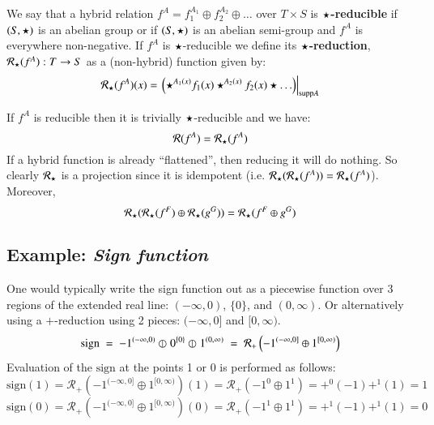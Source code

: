 \begin{definition}
	We say that a hybrid relation $f^A = f_1^{A_1} \oplus f_2^{A_2} \oplus \ldots$ over $T \times S$ 
	is $\star$\textbf{-reducible} if $(S, \star)$ is an abelian group 
	or if $(S, \star)$ is an abelian semi-group and $f^A$ is everywhere non-negative.
	If $f^A$ is $\star$-reducible we define its $\star$\textbf{-reduction}, $\mathcal{R}_\star(f^A) :  T \to S$ 
	as a (non-hybrid) function given by:
	\begin{equation}
		\mathcal{R}_\star (f^A)(x) = \left.\left(\star^{A_1(x)} f_1(x) \star^{A_2(x)} f_2(x) \star \ldots \right)\right|_{\text{supp} A}
	\end{equation}
\end{definition}


If $f^A$ is reducible then it is trivially $\star$-reducible and we have:
\begin{equation}
	\mathcal{R}(f^A) = \mathcal{R}_\star(f^A)
\end{equation}
If a hybrid function is already ``flattened'', then reducing it will do nothing.
So clearly $\mathcal{R}_\star$ is a projection since it is idempotent  (i.e. $\mathcal{R}_\star ( \mathcal{R}_\star( f^A)) = \mathcal{R}_\star(f^A)$).
Moreover,
\begin{equation}
	\mathcal{R}_\star( \mathcal{R}_\star(f^F) \oplus \mathcal{R}_\star(g^G)) =\mathcal{R}_\star( f^F \oplus g^G)
\end{equation}


\subsection{Example: \emph{Sign function}}

One would typically write the sign function out as a piecewise function over 3 regions of the extended real line: 
$(-\infty, 0)$, $\{ 0 \}$, and $(0, \infty)$.
Or alternatively using a $+$-reduction using 2 pieces: $(-\infty, 0]$ and $[0, \infty)$.
\begin{equation}
	\text{sign} \;=\; -1^{(-\infty, 0)} \varobar^{} 0^{\{0\}} \varobar^{} 1^{(0, \infty)}
	\;=\; \mathcal{R}_+ \left( -1^{(-\infty, 0]} \oplus 1^{[0, \infty)} \right)
\end{equation}
Evaluation of the $\text{sign}$ at the points 1 or 0 is performed as follows:
\begin{equation*}
 \text{sign}(1) = \mathcal{R}_+ \left( -1^{(-\infty, 0]} \oplus 1^{[0, \infty)} \right)(1) 
 = \mathcal{R}_+ \left( -1^{0} \oplus 1^{1} \right)
 = +^0 (-1) +^1 (1) = 1
\end{equation*}
\begin{equation*}
 \text{sign}(0) = \mathcal{R}_+ \left( -1^{(-\infty, 0]} \oplus 1^{[0, \infty)} \right)(0) 
 = \mathcal{R}_+ \left( -1^{1} \oplus 1^{1} \right)
 = +^1 (-1) +^1 (1) = 0
\end{equation*}

